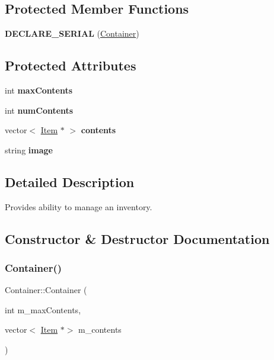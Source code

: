 \subsection*{Protected Member Functions}
\begin{DoxyCompactItemize}
\item 
\hypertarget{class_container_a7b52c4e148c15a81d2190467a13d3caa}{}\label{class_container_a7b52c4e148c15a81d2190467a13d3caa} 
{\bfseries D\+E\+C\+L\+A\+R\+E\+\_\+\+S\+E\+R\+I\+AL} (\hyperlink{class_container}{Container})
\end{DoxyCompactItemize}
\subsection*{Protected Attributes}
\begin{DoxyCompactItemize}
\item 
\hypertarget{class_container_a3fe28bc57e6f01a6a9bccfba763048d1}{}\label{class_container_a3fe28bc57e6f01a6a9bccfba763048d1} 
int {\bfseries max\+Contents}
\item 
\hypertarget{class_container_a1f3d185e09c7c2123b4fb47ab1abf4a7}{}\label{class_container_a1f3d185e09c7c2123b4fb47ab1abf4a7} 
int {\bfseries num\+Contents}
\item 
\hypertarget{class_container_acbee1b88bfda463e1857b924da41e9b9}{}\label{class_container_acbee1b88bfda463e1857b924da41e9b9} 
vector$<$ \hyperlink{class_item}{Item} $\ast$ $>$ {\bfseries contents}
\item 
\hypertarget{class_container_a61889476a53e34d1659111cd5273232c}{}\label{class_container_a61889476a53e34d1659111cd5273232c} 
string {\bfseries image}
\end{DoxyCompactItemize}


\subsection{Detailed Description}
Provides ability to manage an inventory. 

\subsection{Constructor \& Destructor Documentation}
\hypertarget{class_container_adf46b339e71f73d1b29ba0ba628477d9}{}\label{class_container_adf46b339e71f73d1b29ba0ba628477d9} 
\subsubsection{\texorpdfstring{Container()}{Container()}\hspace{0.1cm}{\footnotesize\ttfamily [1/2]}}
{\footnotesize\ttfamily Container\+::\+Container (\begin{DoxyParamCaption}\item[{int}]{m\+\_\+max\+Contents,  }\item[{vector$<$ \hyperlink{class_item}{Item} $\ast$$>$}]{m\+\_\+contents }\end{DoxyParamCaption})}



